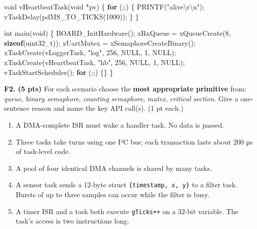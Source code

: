 \documentclass[
  11pt,
]{article}
\newenvironment{Shaded}{}{}
\newcommand{\ControlFlowTok}[1]{\textcolor[rgb]{0.00,0.44,0.13}{\textbf{#1}}}
\newcommand{\DataTypeTok}[1]{\textcolor[rgb]{0.56,0.13,0.00}{#1}}
\newcommand{\DecValTok}[1]{\textcolor[rgb]{0.25,0.63,0.44}{#1}}
\newcommand{\KeywordTok}[1]{\textcolor[rgb]{0.00,0.44,0.13}{\textbf{#1}}}
\newcommand{\NormalTok}[1]{#1}
\newcommand{\OperatorTok}[1]{\textcolor[rgb]{0.40,0.40,0.40}{#1}}
\newcommand{\SpecialCharTok}[1]{\textcolor[rgb]{0.25,0.44,0.63}{#1}}
\newcommand{\StringTok}[1]{\textcolor[rgb]{0.25,0.44,0.63}{#1}}
\providecommand{\tightlist}{%
  \setlength{\itemsep}{0pt}\setlength{\parskip}{0pt}}
\begin{document}
\begin{Shaded}
\begin{Highlighting}[]
\DataTypeTok{void}\NormalTok{ vHeartbeatTask}\OperatorTok{(}\DataTypeTok{void} \OperatorTok{*}\NormalTok{pv}\OperatorTok{)}
\OperatorTok{\{}
    \ControlFlowTok{for} \OperatorTok{(;;)} \OperatorTok{\{}
\NormalTok{        PRINTF}\OperatorTok{(}\StringTok{"alive}\SpecialCharTok{\textbackslash{}r\textbackslash{}n}\StringTok{"}\OperatorTok{);}
\NormalTok{        vTaskDelay}\OperatorTok{(}\NormalTok{pdMS\_TO\_TICKS}\OperatorTok{(}\DecValTok{1000}\OperatorTok{));}
    \OperatorTok{\}}
\OperatorTok{\}}

\DataTypeTok{int}\NormalTok{ main}\OperatorTok{(}\DataTypeTok{void}\OperatorTok{)}
\OperatorTok{\{}
\NormalTok{    BOARD\_InitHardware}\OperatorTok{();}
\NormalTok{    xRxQueue   }\OperatorTok{=}\NormalTok{ xQueueCreate}\OperatorTok{(}\DecValTok{8}\OperatorTok{,} \KeywordTok{sizeof}\OperatorTok{(}\DataTypeTok{uint32\_t}\OperatorTok{));}
\NormalTok{    xUartMutex }\OperatorTok{=}\NormalTok{ xSemaphoreCreateBinary}\OperatorTok{();}
\NormalTok{    xTaskCreate}\OperatorTok{(}\NormalTok{vLoggerTask}\OperatorTok{,}    \StringTok{"log"}\OperatorTok{,} \DecValTok{256}\OperatorTok{,}\NormalTok{ NULL}\OperatorTok{,} \DecValTok{1}\OperatorTok{,}\NormalTok{ NULL}\OperatorTok{);}
\NormalTok{    xTaskCreate}\OperatorTok{(}\NormalTok{vHeartbeatTask}\OperatorTok{,} \StringTok{"hb"}\OperatorTok{,}  \DecValTok{256}\OperatorTok{,}\NormalTok{ NULL}\OperatorTok{,} \DecValTok{1}\OperatorTok{,}\NormalTok{ NULL}\OperatorTok{);}
\NormalTok{    vTaskStartScheduler}\OperatorTok{();}
    \ControlFlowTok{for} \OperatorTok{(;;)} \OperatorTok{\{\}}
\OperatorTok{\}}
\end{Highlighting}
\end{Shaded}

\textbf{F2. (5 pts)} For each scenario choose the \textbf{most
appropriate primitive} from: \emph{queue}, \emph{binary semaphore},
\emph{counting semaphore}, \emph{mutex}, \emph{critical section}. Give a
one-sentence reason and name the key API call(s). (1 pt each.)

\begin{enumerate}
\def\labelenumi{\alph{enumi}.}
\tightlist
\item
  A DMA-complete ISR must wake a handler task. No data is passed.
\item
  Three tasks take turns using one I²C bus; each transaction lasts about
  200 µs of task-level code.
\item
  A pool of four identical DMA channels is shared by many tasks.
\item
  A sensor task sends a 12-byte struct \texttt{\{timestamp,\ x,\ y\}} to
  a filter task. Bursts of up to three samples can occur while the
  filter is busy.
\item
  A timer ISR and a task both execute \texttt{gTicks++} on a 32-bit
  variable. The task's access is two instructions long.
\end{enumerate}
\end{document}
